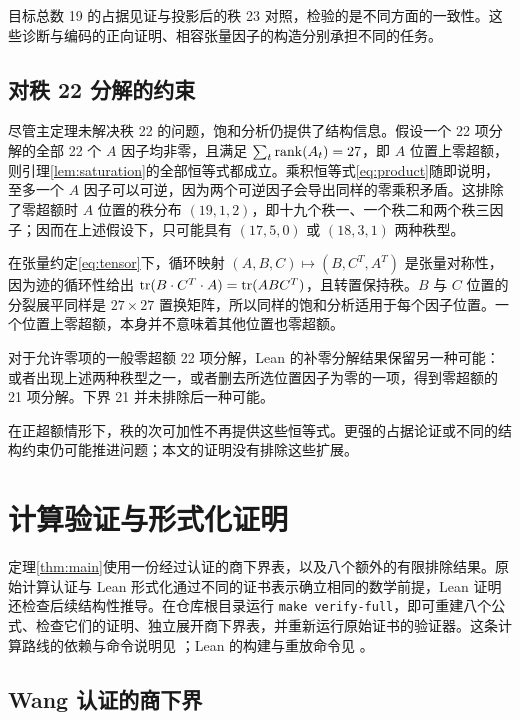\documentclass[11pt,a4paper]{article}
\begin{document}
目标总数 19 的占据见证与投影后的秩 23 对照，检验的是不同方面的一致性。这些诊断与编码的正向证明、相容张量因子的构造分别承担不同的任务。

\subsection{对秩 22 分解的约束}

尽管主定理未解决秩 22 的问题，饱和分析仍提供了结构信息。假设一个 22 项分解的全部 22 个 $A$ 因子均非零，且满足 $\sum_t\operatorname{rank}(A_t)=27$，即 $A$ 位置上零超额，则引理\ref{lem:saturation}的全部恒等式都成立。乘积恒等式\eqref{eq:product}随即说明，至多一个 $A$ 因子可以可逆，因为两个可逆因子会导出同样的零乘积矛盾。这排除了零超额时 $A$ 位置的秩分布 $(19,1,2)$，即十九个秩一、一个秩二和两个秩三因子；因而在上述假设下，只可能具有 $(17,5,0)$ 或 $(18,3,1)$ 两种秩型。

在张量约定\eqref{eq:tensor}下，循环映射 $(A,B,C)\mapsto(B,C^T,A^T)$ 是张量对称性，因为迹的循环性给出 $\operatorname{tr}(B\cdot C^T\cdot A)=\operatorname{tr}(ABC^T)$，且转置保持秩。$B$ 与 $C$ 位置的分裂展平同样是 $27\times27$ 置换矩阵，所以同样的饱和分析适用于每个因子位置。一个位置上零超额，本身并不意味着其他位置也零超额。

对于允许零项的一般零超额 22 项分解，Lean 的补零分解结果保留另一种可能：或者出现上述两种秩型之一，或者删去所选位置因子为零的一项，得到零超额的 21 项分解。下界 21 并未排除后一种可能。

在正超额情形下，秩的次可加性不再提供这些恒等式。更强的占据论证或不同的结构约束仍可能推进问题；本文的证明没有排除这些扩展。

\section{计算验证与形式化证明}\label{sec:machine}

定理\ref{thm:main}使用一份经过认证的商下界表，以及八个额外的有限排除结果。原始计算认证与 Lean 形式化通过不同的证书表示确立相同的数学前提，Lean 证明还检查后续结构性推导。在仓库根目录运行 \texttt{make verify-full}，即可重建八个公式、检查它们的证明、独立展开商下界表，并重新运行原始证书的验证器。这条计算路线的依赖与命令说明见 ；Lean 的构建与重放命令见 。

\subsection{Wang 认证的商下界}
\end{document}
